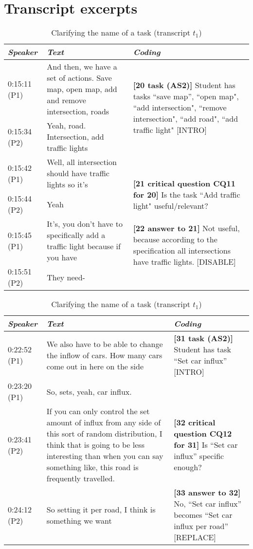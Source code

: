 \section{Transcript excerpts}
\label{sect:transcripts:excerpts}

\begin{table}[!htbp]
\centering
\begin{tabular}{|p{17mm}|p{63mm}|p{70mm}|}
\hline
\textit{Speaker} & \textit{Text} & \textit{Coding}\\
\hline
0:15:11 (P1) & And then, we have a set of actions. Save map, open map, add and remove intersection, roads & \multirow{2}{70mm}{\textbf{[20 task (AS2)]} Student has tasks ``save map'', ``open map", ``add intersection", ``remove intersection", ``add road", ``add traffic light" \textsf{[INTRO]}}\\
\cline{1-2}
0:15:34 (P2) & Yeah, road. Intersection, add traffic lights &\\
\hline
0:15:42 (P1) & Well, all intersection should have traffic lights so it's & \multirow{4}{70mm}{\textbf{[21 critical question CQ11 for 20]} Is the task ``Add traffic light" useful/relevant?\newline\newline
\textbf{[22 answer to 21]} Not useful, because according to the specification all intersections have traffic lights. \textsf{[DISABLE]}}\\
\cline{1-2}
0:15:44 (P2) & Yeah &\\
\cline{1-2}
0:15:45 (P1) & It's, you don't have to specifically add a traffic light because if you have &\\
\cline{1-2}
0:15:51 (P2)	& They need-&\\
\hline
\end{tabular}
\caption{Adding tasks, disabling unnecessary task ``Add traffic light'' (transcript $t_1$)}
\label{table:transcripts:traffic-light}

\begin{tabular}{|p{17mm}|p{63mm}|p{70mm}|}
\hline
\textit{Speaker} & \textit{Text} & \textit{Coding}\\
\hline
0:22:52 (P1) & We also have to be able to change the inflow of cars. How many cars come out in here on the side & \textbf{[31 task (AS2)]} Student has task ``Set car influx'' \textsf{[INTRO]}\\
\cline{1-2}
0:23:20 (P1)	& So, sets, yeah, car influx. & \\
\hline
0:23:41 (P2) &	If you can only control the set amount of influx from any side of this sort of random distribution, I think that is going to be less interesting than when you can say something like, this road is frequently travelled. 	& \textbf{[32 critical question CQ12 for 31]} Is ``Set car influx'' specific enough? \\
\hline
0:24:12 (P2)	& So setting it per road, I think is something we want	& \textbf{[33 answer to 32]} No, ``Set car influx'' becomes ``Set car influx per road'' \textsf{[REPLACE]} \\
\hline
\end{tabular}
\caption{Clarifying the name of a task (transcript $t_1$)}
\label{table:transcript:task-clarification}


\end{table}
